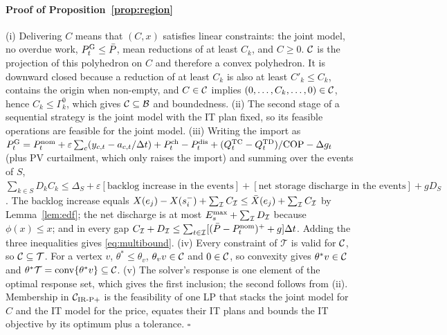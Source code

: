 \paragraph{Proof of Proposition~\ref{prop:region}} (i) Delivering $C$ means that $(C,x)$ satisfies linear constraints:
the joint model, no overdue work, $P^{\mathrm{G}}_t\le\bar P$, mean reductions of at least $C_k$, and $C\ge0$. $\mathcal{C}$ is the
projection of this polyhedron on $C$ and therefore a convex polyhedron. It is downward closed because a reduction of at
least $C_k$ is also at least $C'_k\le C_k$, contains the origin when non-empty, and $C\in\mathcal{C}$ implies
$(0,\dots,C_k,\dots,0)\in\mathcal{C}$, hence $C_k\le\Gamma^0_k$, which gives $\mathcal{C}\subseteq\mathcal B$ and boundedness. (ii)
The second stage of a sequential strategy is the joint model with the IT plan fixed, so its feasible operations are
feasible for the joint model. (iii) Writing the import as
$P^{\mathrm{G}}_t=P^{\mathrm{nom}}_t+\varepsilon\sum_c(y_{c,t}-a_{c,t}/\Delta t)+P^{\mathrm{ch}}_t-P^{\mathrm{dis}}_t+(Q^{\mathrm{TC}}_t-Q^{\mathrm{TD}}_t)/\mathrm{COP}-\Delta g_t$ (plus PV
curtailment, which only raises the import) and summing over the events of $S$,
$\sum_{k\in S}D_kC_k\le\Delta_S+\varepsilon[\text{backlog increase in the events}]+[\text{net storage discharge in the
events}]+gD_S$. The backlog increase equals $X(e_j)-X(s_i^-)+\sum_{\mathcal{I}} C_{\mathcal{I}}\le\bar X(e_j)+\sum_{\mathcal{I}} C_{\mathcal{I}}$ by
Lemma~\ref{lem:edf}; the net discharge is at most $E_s^{\max}+\sum_{\mathcal{I}} D_{\mathcal{I}}$ because $\phi(x)\le x$; and in every
gap $C_{\mathcal{I}}+D_{\mathcal{I}}\le\sum_{t\in\mathcal{I}}[(\bar P-P^{\mathrm{nom}}_t)^++g]\Delta t$. Adding the three inequalities gives
\eqref{eq:multibound}. (iv) Every constraint of $\mathcal T$ is valid for $\mathcal{C}$, so $\mathcal{C}\subseteq\mathcal T$. For a
vertex $v$, $\theta^*\le\theta_v$, $\theta_vv\in\mathcal{C}$ and $0\in\mathcal{C}$, so convexity gives $\theta^*v\in\mathcal{C}$ and
$\theta^*\mathcal T=\mathrm{conv}\{\theta^*v\}\subseteq\mathcal{C}$. (v) The solver's response is one element of the optimal
response set, which gives the first inclusion; the second follows from (ii). Membership in $\mathcal{C}_{\mathrm{IR\text{-}P+}}$
is the feasibility of one LP that stacks the joint model for $C$ and the IT model for the price, equates their IT plans
and bounds the IT objective by its optimum plus a tolerance. $\square$

